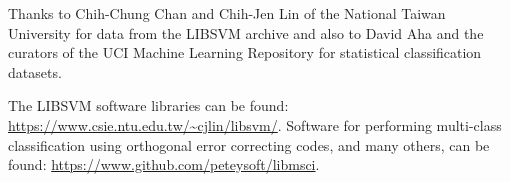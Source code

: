
\author{Peter Mills}



\date{Received: date / Accepted: date}


\maketitle

\begin{abstract}
	
\end{abstract}



\appendix

\begin{acknowledgements}
Thanks to Chih-Chung Chan and Chih-Jen Lin of the National Taiwan University
for data from the LIBSVM archive and also to David Aha and the curators of
the UCI Machine Learning Repository for statistical classification datasets.

	The LIBSVM software libraries can be found: \url{https://www.csie.ntu.edu.tw/~cjlin/libsvm/}. 
	Software for performing multi-class classification using orthogonal error correcting codes, and many others, can be found: \url{https://www.github.com/peteysoft/libmsci}.

\end{acknowledgements}

%


%



